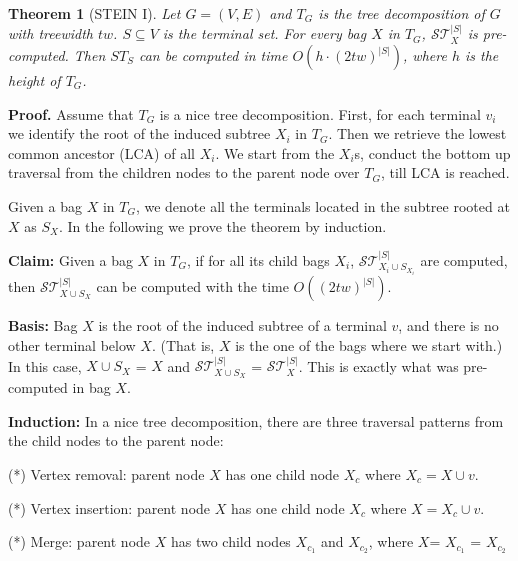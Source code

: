 \documentclass[preprint,12pt]{elsarticle}
\newtheorem{theorem}{Theorem}
\newenvironment{proof}{\begin{trivlist}\item[]\textbf{Proof.}}{\end{trivlist}}
\newcommand{\stset}{\mathcal{ST}}
\begin{document}
\begin{theorem}[STEIN I]
\label{the:stein1}
Let $G=(V,E)$ and $T_G$ is the tree decomposition of $G$ with treewidth $tw$.
$S \subseteq V$ is the terminal set. For every bag $X$ in $T_G$,
$\stset_X^{|S|}$ is pre-computed. Then $ST_S$ can be computed
in time $O(h \cdot (2tw)^{|S|})$, where $h$ is the height of $T_G$.
\end{theorem}




\begin{proof}
Assume that $T_G$ is a nice tree decomposition.
First, for each terminal $v_i$ we  identify the root of the induced subtree $X_i$ in $T_G$.
Then we retrieve the lowest common ancestor (LCA) of all $X_i$.
We start from the $X_i$s, conduct the bottom up traversal from the children nodes to the parent node
over $T_G$, till LCA is reached.

Given a bag $X$ in $T_G$, we denote all the terminals located in the subtree rooted at $X$ as $S_X$.
In the following we prove the theorem by induction.

\noindent
{\bf Claim:} Given a bag $X$ in $T_G$, if for all its child bags $X_i$,
$\stset_{X_i \cup S_{X_i}}^{|S|}$ are computed, then 
$\stset_{X \cup S_{X}}^{|S|}$ can be computed with the time $O( (2tw)^{|S|})$.

\noindent
{\bf Basis:} Bag $X$ is the root of the induced subtree of a terminal $v$, and there is no other terminal below $X$.
(That is, $X$ is the one of the bags where we start with.) 
In this case, $X \cup S_{X}$ = $X$ and $\stset_{X \cup S_{X}}^{|S|}$ = $\stset_{X}^{|S|}$.
This is exactly what was pre-computed in bag $X$.

\noindent
{\bf Induction:} 
In a nice tree decomposition, there are three traversal patterns from the child nodes
to the parent node:


\noindent (*) Vertex removal:
parent node $X$ has one child node $X_c$ where $X_c = X \cup v$.


\noindent (*) Vertex insertion: 
parent node $X$ has one child node $X_c$ where $X = X_c \cup v$.



\noindent (*) Merge: 
parent node $X$ has two child nodes $X_{c_1}$ and $X_{c_2}$,
where $X$= $X_{c_1}$ = $X_{c_2}$



\end{proof}
\end{document}
